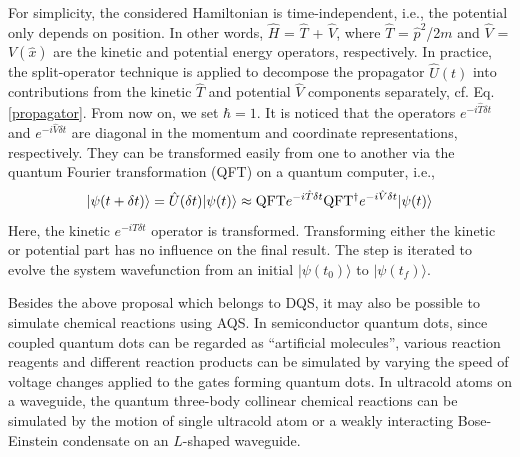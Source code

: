 \documentclass[8.5pt,twoside,twocolumn]{article}
\begin{document}
For simplicity, the considered Hamiltonian is time-independent,
i.e., the potential only depends on position.
In other words, $\hat{H}$ = $\hat{T}$ + $\hat{V}$,
where $\hat{T}$ = $\hat{p}^{2}$/2$m$ and $\hat{V}$ = $V(\hat{x})$
are the kinetic and potential energy operators, respectively.
In practice, the split-operator technique\cite{first_quantization_2,Trotter_1,Trotter_2}
is applied to decompose the propagator $\hat{U}(t)$
into contributions from the kinetic $\hat{T}$ and potential $\hat{V}$
components separately, cf. Eq. \ref{propagator}. From now on, we set $\hbar=1$.
It is noticed that the operators $e^{ - i \hat{T} \delta t}$
and $e^{ - i \hat{V} \delta t}$
are diagonal in the momentum and coordinate representations, respectively.
They can be transformed easily from one to another
via the quantum Fourier transformation (QFT)\cite{QFT_1}
on a quantum computer, i.e.,
\[|\psi (t+\delta t)\rangle  = \hat U(\delta t)|\psi (t)\rangle
  \approx {\rm{QFT}}{e^{-i\hat T\delta t}}
  {\rm{QF}}{{\rm{T}}^{\rm{\dag}}}{e^{-i\hat V\delta t}}|\psi (t)\rangle \]
Here, the kinetic $e^{ - i \hat{T} \delta t}$ operator is transformed.
Transforming either the kinetic or
potential part has no influence on the final result.
The step is iterated to evolve the system wavefunction from an initial
$|\psi(t_0) \rangle$ to $|\psi(t_f) \rangle$.



Besides the above proposal which belongs to DQS, it may also be possible to simulate chemical reactions using AQS. In semiconductor quantum dots,\cite{AQS_3} since coupled quantum dots can be regarded as ``artificial molecules'', various reaction reagents and different reaction products can be simulated by varying the speed of voltage changes applied to the gates forming quantum dots. In ultracold atoms on a waveguide,\cite{ultracold} the quantum three-body collinear chemical reactions can be simulated by the motion of single ultracold atom or a weakly interacting Bose-Einstein condensate on an $L$-shaped waveguide.
\end{document}
